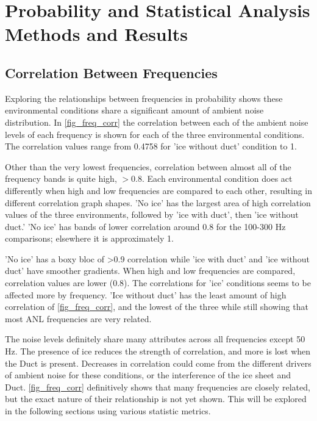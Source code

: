 \section{Probability and Statistical Analysis Methods and Results}

\subsection{Correlation Between Frequencies} \label{sec_corr_freq}

Exploring the relationships between frequencies in probability shows these environmental conditions share a significant amount of ambient noise distribution. In \autoref{fig_freq_corr} the correlation between each of the ambient noise levels of each frequency is shown for each of the three environmental conditions. The correlation values range from 0.4758 for 'ice without duct' condition to 1. 

Other than the very lowest frequencies, correlation between almost all of the frequency bands is quite high, $>0.8$.  Each environmental condition does act differently when high and low frequencies are compared to each other, resulting in different correlation graph shapes. 'No ice' has the largest area of high correlation values of the three environments, followed by 'ice with duct', then 'ice without duct.' 'No ice' has bands of lower correlation around 0.8 for the 100-300 Hz comparisons; elsewhere it is approximately 1.

'No ice' has a boxy bloc of >0.9 correlation while 'ice with duct' and 'ice without duct' have smoother gradients. When high and low frequencies are compared, correlation values are lower (0.8). The correlations for 'ice' conditions seems to be affected more by frequency. 'Ice without duct' has the least amount of high correlation of \autoref{fig_freq_corr}, and the lowest of the three while still showing that most ANL frequencies are very related.

The noise levels definitely share many attributes across all frequencies except 50 Hz. The presence of ice reduces the strength of correlation, and more is lost when the Duct is present. Decreases in correlation could come from the different drivers of ambient noise for these conditions, or the interference of the ice sheet and Duct. \autoref{fig_freq_corr} definitively shows that many frequencies are closely related, but the exact nature of their relationship is not yet shown. This will be explored in the following sections using various statistic metrics. 

